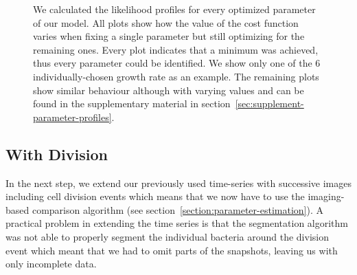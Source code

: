 \documentclass[10pt,letterpaper]{article}
\begin{document}
\begin{figure}
\begin{tikzonimage}[width=0.25\textwidth]
    \end{tikzonimage}%
    \caption{
        We calculated the likelihood profiles for every optimized parameter of our model.
        All plots show how the value of the cost function varies when fixing a single parameter but
        still optimizing for the remaining ones.
        Every plot indicates that a minimum was achieved, thus every parameter could be identified.
        We show only one of the 6 individually-chosen growth rate as an example.
        The remaining plots show similar behaviour although with varying values and can be found in
        the supplementary material in section~\ref{sec:supplement-parameter-profiles}.
    }
    \label{fig:parameter-estimates-single-step}
\end{figure}

\subsection{With Division}

In the next step, we extend our previously used time-series with successive images including
cell division events which means that we now have to use the imaging-based comparison algorithm (see
section~\ref{section:parameter-estimation}).
A practical problem in extending the time series is that the segmentation algorithm was not able to
properly segment the individual bacteria around the division event which meant that we had to omit
parts of the snapshots, leaving us with only incomplete data.
\end{document}
